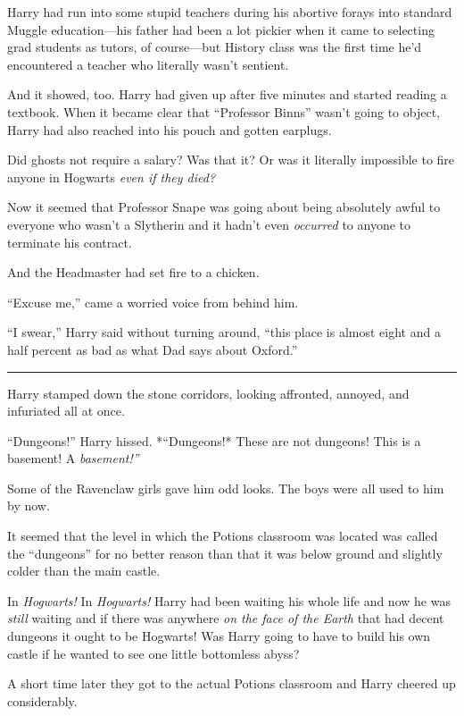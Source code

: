 Harry had run into some stupid teachers during his abortive forays into
standard Muggle education---his father had been a lot pickier when it
came to selecting grad students as tutors, of course---but History class
was the first time he'd encountered a teacher who literally wasn't
sentient.

And it showed, too. Harry had given up after five minutes and started
reading a textbook. When it became clear that ``Professor Binns'' wasn't
going to object, Harry had also reached into his pouch and gotten
earplugs.

Did ghosts not require a salary? Was that it? Or was it literally
impossible to fire anyone in Hogwarts \emph{even if they died?}

Now it seemed that Professor Snape was going about being absolutely
awful to everyone who wasn't a Slytherin and it hadn't even
\emph{occurred} to anyone to terminate his contract.

And the Headmaster had set fire to a chicken.

``Excuse me,'' came a worried voice from behind him.

``I swear,'' Harry said without turning around, ``this place is almost
eight and a half percent as bad as what Dad says about Oxford.''

\begin{center}\rule{3in}{0.4pt}\end{center}

Harry stamped down the stone corridors, looking affronted, annoyed, and
infuriated all at once.

``Dungeons!'' Harry hissed. *``Dungeons!* These are not dungeons! This
is a basement! A \emph{basement!''}

Some of the Ravenclaw girls gave him odd looks. The boys were all used
to him by now.

It seemed that the level in which the Potions classroom was located was
called the ``dungeons'' for no better reason than that it was below
ground and slightly colder than the main castle.

In \emph{Hogwarts!} In \emph{Hogwarts!} Harry had been waiting his whole
life and now he was \emph{still} waiting and if there was anywhere
\emph{on the face of the Earth} that had decent dungeons it ought to be
Hogwarts! Was Harry going to have to build his own castle if he wanted
to see one little bottomless abyss?

A short time later they got to the actual Potions classroom and Harry
cheered up considerably.


